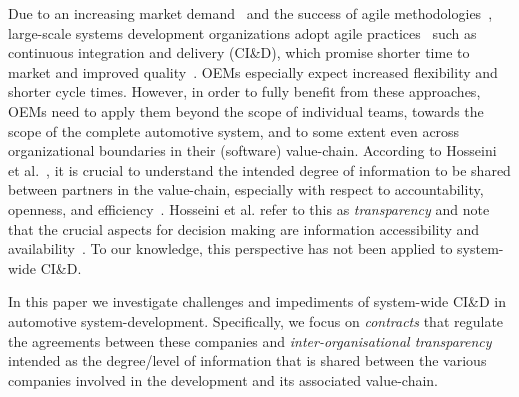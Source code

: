 Due to an increasing market demand~\cite{olsson2012climbing} and the success of agile methodologies~\cite{laanti2011agile}, large-scale systems development organizations adopt agile practices~\cite{jalali2010agile} such as continuous integration and delivery (CI\&D), which promise shorter time to market and improved quality~\cite{olsson2012climbing}.
OEMs especially expect increased flexibility and shorter cycle times.
However, in order to fully benefit from these approaches, OEMs need to apply them %
beyond the scope of individual teams, towards the scope of the complete automotive system,  %
and to some extent even across organizational boundaries in their (software) value-chain. %
According to Hosseini et al.~\cite{Hosseini2016}, it is crucial to understand the intended degree of information to be shared between partners in the value-chain, especially with respect to accountability, openness, and efficiency~\cite{Ball2009}.
Hosseini et al. refer to this as \emph{transparency} and note that the crucial aspects for decision making are information accessibility and availability~\cite{Hosseini2016,Turilli2009}.
To our knowledge, this perspective has not been applied to system-wide CI\&D. %

In this paper we investigate %
challenges and impediments of system-wide CI\&D in automotive system-development. 
Specifically, we focus on {\em contracts} that regulate the agreements between these companies 
and {\em {inter-organisational} transparency} intended as the degree/level of information that is shared between the various companies %
involved in the development and its associated value-chain. %

